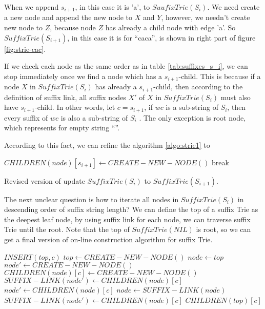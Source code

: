 \documentclass{article}
\begin{document}
When we append $s_{i+1}$, in this case it is 'a', to $SuufixTrie(S_i)$. We need create
a new node and append the new node to $X$ and $Y$, however, we needn't create new
node to $Z$, because node $Z$ has already a child node with edge 'a'. So 
$SuffixTrie(S_{i+1})$, in this case it is for ``caca'', is shown in right part of
figure \ref{fig:strie-cac}.

If we check each node as the same order as in table \ref{tab:suffixes_s_i}, we can 
stop immediately once we find a node which has a $s_{i+1}$-child. This is because 
if a node $X$ in $SuffixTrie(S_i)$ has already a $s_{i+1}$-child, then according to the
definition of suffix link, all suffix nodes $X'$ of $X$ in $SuffixTrie(S_i)$ must 
also have $s_{i+1}$-child. In other words, let $c=s_{i+1}$, if $wc$ is a sub-string
of $S_i$, then every suffix of $wc$ is also a sub-string of $S_i$ \cite{ukkonen95}.
The only exception is root node, which represents for empty string ``''.

According to this fact, we can refine the algorithm \ref{algo:strie1} to 

\begin{algorithm}
  \begin{algorithmic}
      \STATE $CHILDREN(node)[s_{i+1}] \leftarrow CREATE-NEW-NODE()$ 
    \ELSE
      \STATE break
    \ENDIF
  \ENDFOR
  \end{algorithmic}
  \caption{Revised version of update $SuffixTrie(S_i)$ to $SuffixTrie(S_{i+1})$.}
  \label{algo:strie2}
\end{algorithm}

The next unclear question is how to iterate all nodes in $SuffixTrie(S_i)$
in descending order of suffix string length? We can define the top of a suffix
Trie as the deepest leaf node, by using suffix link for each node, we can 
traverse suffix Trie until the root. Note that the top of $SuffixTrie(NIL)$
is root, so we can get a final version of on-line construction algorithm for
suffix Trie.

\begin{algorithmic}
\STATE $INSERT(top, c)$
    \STATE $top \leftarrow CREATE-NEW-NODE()$
  \ENDIF
  \STATE $node \leftarrow top$
  \STATE $node' \leftarrow CREATE-NEW-NODE()$
    \STATE $CHILDREN(node)[c] \leftarrow CREATE-NEW-NODE()$
    \STATE $SUFFIX-LINK(node') \leftarrow CHILDREN(node)[c]$
    \STATE $node' \leftarrow CHILDREN(node)[c]$
    \STATE $node \leftarrow SUFFIX-LINK(node)$
  \ENDWHILE
    \STATE $SUFFIX-LINK(node') \leftarrow CHILDREN(node)[c]$
  \ENDIF
  \RETURN $CHILDREN(top)[c]$
\end{algorithmic}
\end{document}
